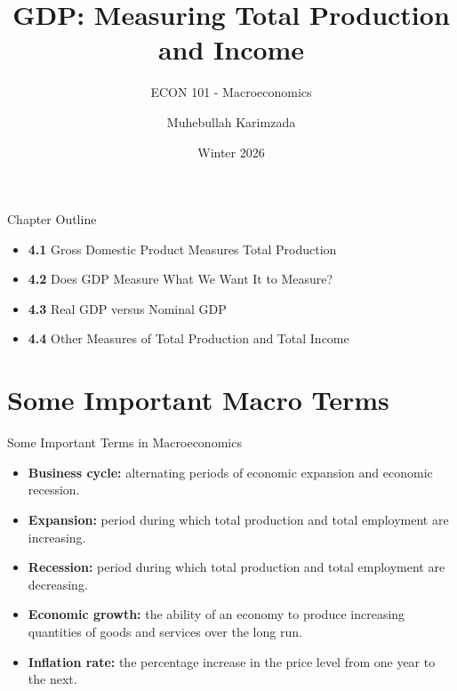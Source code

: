 \documentclass[aspectratio=169]{beamer}
\title{\textbf{GDP: Measuring Total Production and Income\vspace{.5cm}\\  }}
\subtitle{ {\large ECON 101 - Macroeconomics}}
\author{Muhebullah Karimzada}
\date{Winter 2026}
\begin{document}
\begin{frame}[plain]
  \titlepage
\end{frame}

\begin{frame}{Chapter Outline}
\transfade
\begin{itemize}
  \item \textbf{4.1} Gross Domestic Product Measures Total Production
  \item \textbf{4.2} Does GDP Measure What We Want It to Measure?
  \item \textbf{4.3} Real GDP versus Nominal GDP
  \item \textbf{4.4} Other Measures of Total Production and Total Income
\end{itemize}
\end{frame}

\section*{Some Important Macro Terms}

\begin{frame}{Some Important Terms in Macroeconomics}
\transfade
\begin{itemize}
  \item \textbf{Business cycle:} alternating periods of economic \alert{expansion} and economic \alert{recession}.
  \item \textbf{Expansion:} period during which total production and total employment are \alert{increasing}.
  \item \textbf{Recession:} period during which total production and total employment are \alert{decreasing}.
  \item \textbf{Economic growth:} the ability of an economy to produce \alert{increasing quantities} of goods and services over the long run.
  \item \textbf{Inflation rate:} the \alert{percentage increase} in the price level from one year to the next.
\end{itemize}
\end{frame}

\end{document}
